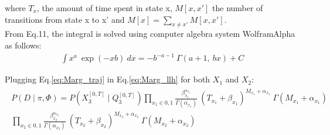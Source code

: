 where $ T_{x} $, the amount of time spent in state x, $ M[x,x'] $ the number of transitions from state x to x' and  $ M[x] = \sum_{x\neq x'}M[x,x'] $.\\

From Eq.11, the integral is solved using computer algebra system WolframAlpha as follows:
\begin{align}
\int x^{a} \ \exp(-xb) \ dx = -b^{-a-1} \ \Gamma(a+1, \ bx) + C
\label{eq:integral}
\end{align}

Plugging Eq.\ref{eq:Marg_traj} in Eq.\ref{eq:Marg_llh} for both $ X_{1} $ and $ X_{2} $:
\begin{align}
\begin{split}
P(\textit{D} \mid \pi, \Phi ) = P(X_{3}^{[0, T]}\mid Q_{3}^{[0, T]}) \prod_{x_{1}\in{0,1}} \frac{\beta_{x_{1}}^{\alpha_{x_{1}}}}{\Gamma(\alpha_{x_{1}})} \ (T_{x_{1}}+\beta_{x_{1}})^{M_{x_{1}} + \alpha_{x_{1}}}\ \Gamma(M_{x_{1}} + \alpha_{x_{1}})  \\  \prod_{x_{2}\in{0,1}} \frac{\beta_{x_{2}}^{\alpha_{x_{2}}}}{\Gamma(\alpha_{x_{2}})} \ (T_{x_{2}}+\beta_{x_{2}})^{M_{x_{2}} + \alpha_{x_{2}}}\ \Gamma(M_{x_{2}} + \alpha_{x_{2}})
\label{eq:Marg_llh_final}
\end{split}
\end{align}
